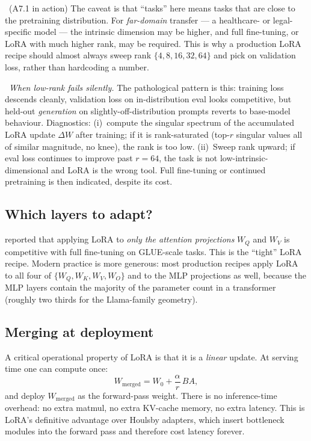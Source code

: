 \Assum\ (A7.1 in action) The caveat is that ``tasks'' here means tasks
that are close to the pretraining distribution. For \emph{far-domain}
transfer --- a healthcare- or legal-specific model --- the intrinsic
dimension may be higher, and full fine-tuning, or LoRA with much higher
rank, may be required. This is why a production LoRA recipe should
almost always sweep rank $\{4, 8, 16, 32, 64\}$ and pick on validation
loss, rather than hardcoding a number.

\Cons\ \emph{When low-rank fails silently.} The pathological pattern is
this: training loss descends cleanly, validation loss on in-distribution
eval looks competitive, but held-out \emph{generation} on
slightly-off-distribution prompts reverts to base-model behaviour.
Diagnostics: (i)~compute the singular spectrum of the accumulated
LoRA update $\Delta W$ after training; if it is rank-saturated (top-$r$
singular values all of similar magnitude, no knee), the rank is too
low. (ii)~Sweep rank upward; if eval loss continues to improve past
$r=64$, the task is not low-intrinsic-dimensional and LoRA is the
wrong tool. Full fine-tuning or continued pretraining is then
indicated, despite its cost.

\subsection{Which layers to adapt?}

\citet{hu2021lora} reported that applying LoRA to \emph{only the
attention projections} $W_Q$ and $W_V$ is competitive with full
fine-tuning on GLUE-scale tasks. This is the ``tight'' LoRA recipe.
Modern practice is more generous: most production recipes apply LoRA
to all four of $\{W_Q, W_K, W_V, W_O\}$ and to the MLP projections
as well, because the MLP layers contain the majority of the
parameter count in a transformer (roughly two thirds for the
Llama-family geometry).

\subsection{\label{subsec:lora-merge}Merging at deployment}

A critical operational property of LoRA is that it is a
\emph{linear} update. At serving time one can compute once:
\begin{equation}
  W_\text{merged} = W_0 + \frac{\alpha}{r}\, B A,
\end{equation}
and deploy $W_\text{merged}$ as the forward-pass weight. There is no
inference-time overhead: no extra matmul, no extra KV-cache memory,
no extra latency. This is LoRA's definitive advantage over Houlsby
adapters, which insert bottleneck modules into the forward pass and
therefore cost latency forever.

